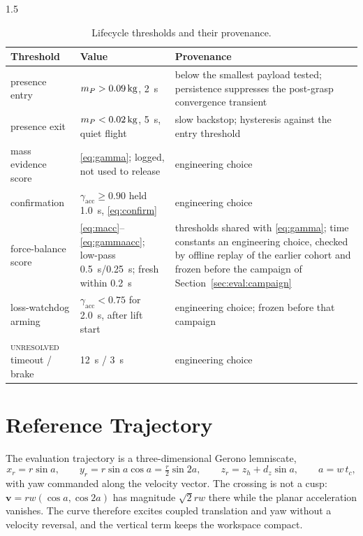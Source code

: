 \begin{spacing}{1.5}
\begin{table}[ht]
\centering
\caption{Lifecycle thresholds and their provenance.}
\label{tab:thresholds}
\small
\begin{tabularx}{\textwidth}{@{}p{} p{} X@{}}
\toprule
\textbf{Threshold} & \textbf{Value} & \textbf{Provenance} \\
\midrule
presence entry & $\mP>\SI{0.09}{\kg}$, \SI{2}{\second} &
below the smallest payload tested; persistence suppresses the post-grasp
convergence transient \\
presence exit & $\mP<\SI{0.02}{\kg}$, \SI{5}{\second}, quiet flight &
slow backstop; hysteresis against the entry threshold \\
mass evidence score & \eqref{eq:gamma}; logged, not used to release & engineering choice \\
confirmation & $\gamma_{\mathrm{acc}}\ge0.90$ held \SI{1.0}{\second}, \eqref{eq:confirm} & engineering choice \\
force-balance score & \eqref{eq:macc}--\eqref{eq:gammaacc}; low-pass \SI{0.5}{\second}/\SI{0.25}{\second}; fresh within \SI{0.2}{\second} & thresholds shared with \eqref{eq:gamma}; time constants an engineering choice, checked by offline replay of the earlier cohort and frozen before the campaign of Section~\ref{sec:eval:campaign} \\
loss-watchdog arming & $\gamma_{\mathrm{acc}}<0.75$ for \SI{2.0}{\second}, after lift start & engineering choice; frozen before that campaign \\
\textsc{unresolved} timeout / brake & \SI{12}{\second} / \SI{3}{\second} & engineering choice \\
\bottomrule
\end{tabularx}
\end{table}

\section{Reference Trajectory}\label{sec:frame:ref}

The evaluation trajectory is a three-dimensional Gerono lemniscate,
\begin{equation}
x_r = r\sin a, \qquad
y_r = r\sin a\cos a = \tfrac{r}{2}\sin 2a, \qquad
z_r = z_h + d_z\sin a, \qquad a = w\,t_c ,
\label{eq:fig8}
\end{equation}
with yaw commanded along the velocity vector. The crossing is not a cusp:
$\bm v=rw(\cos a,\cos2a)$ has magnitude $\sqrt2rw$ there while the planar
acceleration vanishes. The curve therefore excites coupled translation and yaw
without a velocity reversal, and the vertical term keeps the workspace compact.


\end{spacing}
